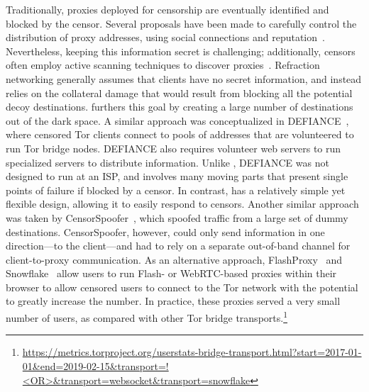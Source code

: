 Traditionally, proxies deployed for censorship are eventually identified and
blocked by the censor. Several proposals have been made to carefully control
the distribution of proxy addresses, using social connections and
reputation~\cite{proximax,rbridge,salmon}. Nevertheless, keeping this
information secret is challenging; additionally, censors often employ active
scanning techniques to discover proxies~\cite{Dunna2018a}. Refraction
networking generally assumes that clients have no secret information, and
instead relies on the  collateral damage that would result from blocking all
the potential decoy destinations. \scheme furthers this goal by creating a
large number of destinations out of the dark space. A similar approach was
conceptualized in DEFIANCE~\cite{lincoln2012}, where censored Tor clients
connect to pools of addresses that are volunteered to run Tor bridge nodes.
DEFIANCE also requires volunteer web servers to run specialized servers to
distribute information. Unlike \scheme, DEFIANCE was not designed to run at an
ISP, and involves many moving parts that present single points of failure if
blocked by a censor. In contrast, \scheme has a relatively simple yet flexible
design, allowing it to easily respond to censors.
Another similar approach was
taken by CensorSpoofer~\cite{censorspoofer}, which spoofed traffic from a large
set of dummy destinations. CensorSpoofer, however, could only send information
in one direction---to the client---and had to rely on a separate out-of-band
channel for client-to-proxy communication. As an alternative approach,
FlashProxy~\cite{flash-proxies} and Snowflake~\cite{snowflake} allow users to
run Flash- or WebRTC-based proxies within their browser to allow censored users
to connect to the Tor network with the potential to greatly increase the
number. In practice, these proxies served a very small number of users, as
compared with other Tor bridge transports.\footnote{\url{https://metrics.torproject.org/userstats-bridge-transport.html?start=2017-01-01&end=2019-02-15&transport=!<OR>&transport=websocket&transport=snowflake}}
